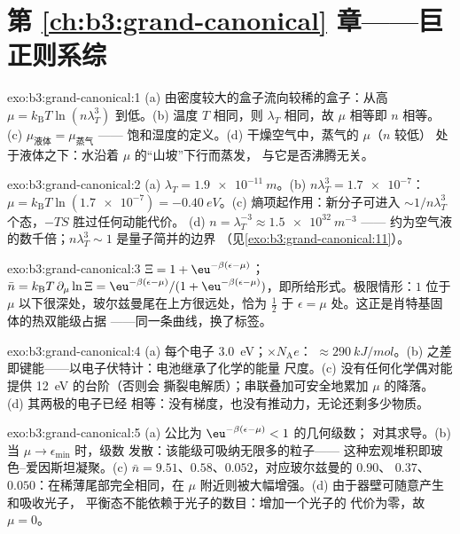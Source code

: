 \section*{第 \ref{ch:b3:grand-canonical} 章——巨正则系综}

\begin{solution}{exo:b3:grand-canonical:1}
(a) 由密度较大的盒子流向较稀的盒子：从高 $\mu =
k_{\text{B}}T\ln(n\lambda_T^3)$ 到低。(b) 温度 $T$ 相同，则
$\lambda_T$ 相同，故 $\mu$ 相等即 $n$ 相等。(c)
$\mu_{\text{液体}} = \mu_{\text{蒸气}}$ ——
饱和湿度的定义。(d) 干燥空气中，蒸气的 $\mu$（$n$ 较低）
处于液体之下：水沿着 $\mu$ 的“山坡”下行而蒸发，
与它是否沸腾无关。
\end{solution}

\begin{solution}{exo:b3:grand-canonical:2}
(a) $\lambda_T = \qty{1.9e-11}{m}$。(b) $n\lambda_T^3 =
\num{1.7e-7}$：$\mu = k_{\text{B}}T\ln(\num{1.7e-7}) =
\qty{-0.40}{eV}$。(c) 熵项起作用：新分子可进入
$\sim1/n\lambda_T^3$ 个态，$-TS$ 胜过任何动能代价。
(d) $n = \lambda_T^{-3} \approx \qty{1.5e32}{m^{-3}}$ ——
约为空气液的数千倍；$n\lambda_T^3 \sim 1$
是量子简并的边界
（见\cref{exo:b3:grand-canonical:11}）。
\end{solution}

\begin{solution}{exo:b3:grand-canonical:3}
$\Xi = 1 + \eu^{-\beta(\epsilon-\mu)}$；$\bar n = k_{\text{B}}T\,
\partial_\mu\ln\Xi = \eu^{-\beta(\epsilon-\mu)}/(1 +
\eu^{-\beta(\epsilon-\mu)})$，即所给形式。极限情形：$1$ 位于
$\mu$ 以下很深处，玻尔兹曼尾在上方很远处，恰为 $\tfrac12$
于 $\epsilon = \mu$ 处。这正是肖特基固体的热双能级占据
——同一条曲线，换了标签。
\end{solution}

\begin{solution}{exo:b3:grand-canonical:4}
(a) 每个电子 \qty{3.0}{eV}；$\times N_{\text{A}}e$：
$\approx\qty{290}{kJ/mol}$。(b) 之差
即键能——以电子伏特计：电池继承了化学的能量
尺度。(c) 没有任何化学偶对能提供 \qty{12}{eV} 的台阶（否则会
撕裂电解质）；串联叠加可安全地累加 $\mu$ 的降落。
(d) 其两极的电子已经
相等：没有梯度，也没有推动力，无论还剩多少物质。
\end{solution}

\begin{solution}{exo:b3:grand-canonical:5}
(a) 公比为 $\eu^{-\beta(\epsilon-\mu)} < 1$ 的几何级数；
对其求导。(b) 当 $\mu \to \epsilon_{\min}$ 时，级数
发散：该能级可吸纳无限多的粒子——
这种宏观堆积即玻色–爱因斯坦凝聚。(c)
$\bar n = 9.51$、$0.58$、$0.052$，对应玻尔兹曼的 $0.90$、
$0.37$、$0.050$：在稀薄尾部完全相同，在
$\mu$ 附近则被大幅增强。(d) 由于器壁可随意产生和吸收光子，
平衡态不能依赖于光子的数目：增加一个光子的
代价为零，故 $\mu = 0$。
\end{solution}

